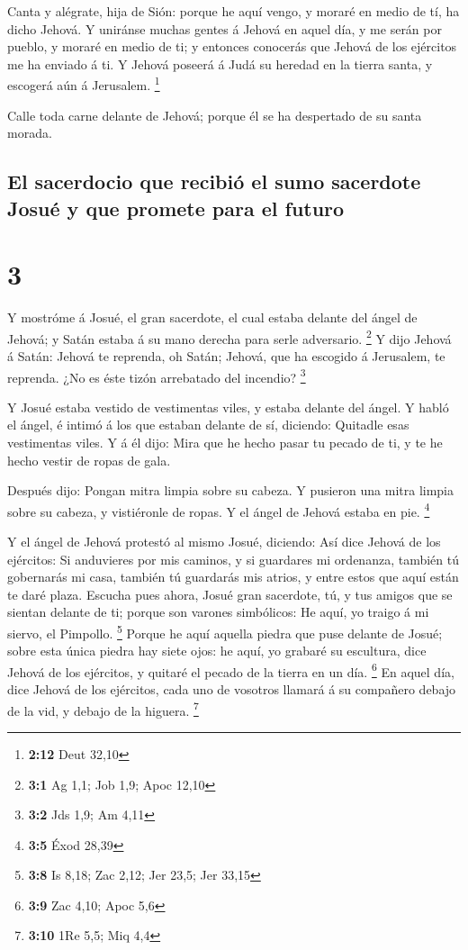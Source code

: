  Canta y alégrate, hija de Sión: porque he aquí vengo, y
moraré en medio de tí, ha dicho Jehová.  Y uniránse muchas
gentes á Jehová en aquel día, y me serán por pueblo, y moraré en medio
de ti; y entonces conocerás que Jehová de los ejércitos me ha enviado á
ti.  Y Jehová poseerá á Judá su heredad en la tierra santa,
y escogerá aún á Jerusalem. \footnote{\textbf{2:12} Deut 32,10}

 Calle toda carne delante de Jehová; porque él se ha
despertado de su santa morada.

\hypertarget{el-sacerdocio-que-recibiuxf3-el-sumo-sacerdote-josuuxe9-y-que-promete-para-el-futuro}{%
\subsection{El sacerdocio que recibió el sumo sacerdote Josué y que
promete para el
futuro}\label{el-sacerdocio-que-recibiuxf3-el-sumo-sacerdote-josuuxe9-y-que-promete-para-el-futuro}}

\hypertarget{section-2}{%
\section{3}\label{section-2}}

 Y mostróme á Josué, el gran sacerdote, el cual estaba
delante del ángel de Jehová; y Satán estaba á su mano derecha para serle
adversario. \footnote{\textbf{3:1} Ag 1,1; Job 1,9; Apoc 12,10}
 Y dijo Jehová á Satán: Jehová te reprenda, oh Satán;
Jehová, que ha escogido á Jerusalem, te reprenda. ¿No es éste tizón
arrebatado del incendio? \footnote{\textbf{3:2} Jds 1,9; Am 4,11}

 Y Josué estaba vestido de vestimentas viles, y estaba
delante del ángel.  Y habló el ángel, é intimó á los que
estaban delante de sí, diciendo: Quitadle esas vestimentas viles. Y á él
dijo: Mira que he hecho pasar tu pecado de ti, y te he hecho vestir de
ropas de gala.

 Después dijo: Pongan mitra limpia sobre su cabeza. Y
pusieron una mitra limpia sobre su cabeza, y vistiéronle de ropas. Y el
ángel de Jehová estaba en pie. \footnote{\textbf{3:5} Éxod 28,39}

 Y el ángel de Jehová protestó al mismo Josué, diciendo:
 Así dice Jehová de los ejércitos: Si anduvieres por mis
caminos, y si guardares mi ordenanza, también tú gobernarás mi casa,
también tú guardarás mis atrios, y entre estos que aquí están te daré
plaza.  Escucha pues ahora, Josué gran sacerdote, tú, y tus
amigos que se sientan delante de ti; porque son varones simbólicos: He
aquí, yo traigo á mi siervo, el Pimpollo. \footnote{\textbf{3:8} Is
  8,18; Zac 2,12; Jer 23,5; Jer 33,15}  Porque he aquí
aquella piedra que puse delante de Josué; sobre esta única piedra hay
siete ojos: he aquí, yo grabaré su escultura, dice Jehová de los
ejércitos, y quitaré el pecado de la tierra en un día. \footnote{\textbf{3:9}
  Zac 4,10; Apoc 5,6}  En aquel día, dice Jehová de los
ejércitos, cada uno de vosotros llamará á su compañero debajo de la vid,
y debajo de la higuera. \footnote{\textbf{3:10} 1Re 5,5; Miq 4,4}

